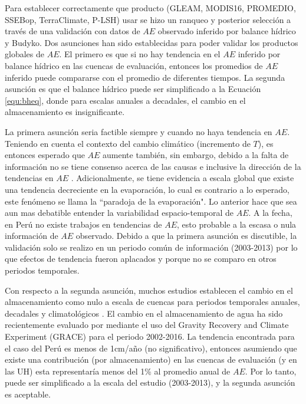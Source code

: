 \documentclass[12pt]{article}
\begin{document}
\thispagestyle{empty}

Para establecer correctamente que producto (GLEAM, MODIS16, PROMEDIO, SSEBop, TerraClimate, P-LSH) usar se hizo un ranqueo y posterior selección a través de una validación con datos de $AE$ observado inferido por balance hídrico y Budyko. Dos asunciones han sido establecidas para poder validar los productos globales de $AE$. El primero es que si no hay tendencia en el $AE$ inferido por balance hídrico en las cuencas de evaluación, entonces los promedios de $AE$ inferido puede compararse con el promedio de diferentes tiempos. La segunda asunción es que el balance hídrico puede ser simplificado a la Ecuación \ref{equ:bheq}, donde para escalas anuales a decadales, el cambio en el almacenamiento es insignificante.

La primera asunción seria factible siempre y cuando no haya tendencia en $AE$. Teniendo en cuenta el contexto del cambio climático (incremento de $T$), es entonces esperado que $AE$ aumente también, sin embargo, debido a la falta de información no se tiene consenso acerca de las causas e inclusive la dirección de la tendencias en $AE$ \citep{hobbins2004trends,cong2009does,wang2011trends,miralles2016wacmos,douville2013anthropogenic,zhang2016multi}. Adicionalmente, se tiene evidencia a escala global que existe una tendencia decreciente en la evaporación, lo cual es contrario a lo esperado, este fenómeno se llama la “paradoja de la evaporación". Lo anterior hace que sea aun mas debatible entender la variabilidad espacio-temporal de $AE$. A la fecha, en Perú no existe trabajos en tendencias de $AE$, esto probable a la escasa o nula información de $AE$ observado. Debido a que la primera asunción es discutible, la validación solo se realizo en un periodo común de información (2003-2013) por lo que efectos de tendencia fueron aplacados y porque no se comparo en otros periodos temporales.

Con respecto a la segunda asunción, muchos estudios establecen el cambio en el almacenamiento como nulo a escala de cuencas para periodos temporales anuales, decadales y climatológicos \citep{Budyko1961,Fu1981,Zhang2008,Wang2014,Singh2015}. El cambio en el almacenamiento de agua ha sido recientemente evaluado por \citet{rodell2018emerging} mediante el uso del Gravity Recovery and Climate Experiment (GRACE) para el periodo 2002-2016. La tendencia encontrada para el caso del Perú es menos de 1cm/año (no significativo), entonces asumiendo que existe una contribución (por almacenamiento) en las cuencas de evaluación (y en las UH) esta representaría menos del 1\% al promedio anual de $AE$. Por lo tanto, puede ser simplificado a la escala del estudio (2003-2013), y la segunda asunción es aceptable.
\end{document}
